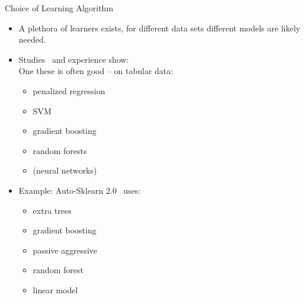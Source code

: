 \begin{frame}{Choice of Learning Algorithm}
  \begin{itemize}
    \item A plethora of learners exists, for different data sets different models
        are likely needed.
    \item Studies~ and experience show:\\
        One these is often good -- on tabular data:
    \begin{itemize}
      \item penalized regression
      \item SVM
      \item gradient boosting
       \item random forests
     \item (neural networks)
  \end{itemize}
      \item Example: Auto-Sklearn 2.0~ uses: 
    \begin{itemize}
        \item extra trees 
         \item gradient boosting 
         \item passive aggressive 
        \item random forest 
        \item linear model
  \end{itemize}
    \end{itemize}
\end{frame}

